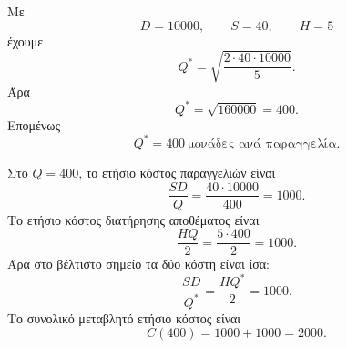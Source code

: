 \begin{alist}
  \item Με
        \[
          D=10000,\qquad S=40,\qquad H=5
        \]
        έχουμε
        \[
          Q^*
          =
          \sqrt{\frac{2\cdot40\cdot10000}{5}}.
        \]
        Άρα
        \[
          Q^*
          =
          \sqrt{160000}
          =
          400.
        \]
        Επομένως
        \[
          {Q^*=400\ \text{μονάδες ανά παραγγελία}}.
        \]

        Στο \(Q=400\), το ετήσιο κόστος παραγγελιών είναι
        \[
          \frac{SD}{Q}
          =
          \frac{40\cdot10000}{400}
          =
          1000.
        \]
        Το ετήσιο κόστος διατήρησης αποθέματος είναι
        \[
          \frac{HQ}{2}
          =
          \frac{5\cdot400}{2}
          =
          1000.
        \]
        Άρα στο βέλτιστο σημείο τα δύο κόστη είναι ίσα:
        \[
          {
          \frac{SD}{Q^*}=\frac{HQ^*}{2}=1000
          }.
        \]
        Το συνολικό μεταβλητό ετήσιο κόστος είναι
        \[
          C(400)=1000+1000=2000.
        \]
\end{alist}
